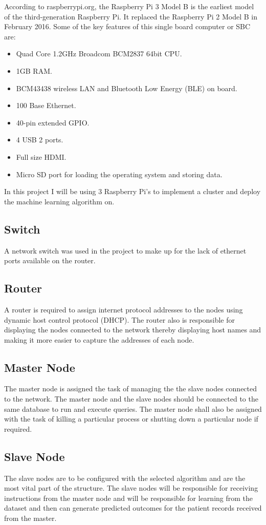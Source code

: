 \documentclass[12pt]{article}
\begin{document}
According to raspberrypi.org, the Raspberry Pi 3 Model B is the earliest model of the third-generation Raspberry Pi. It replaced the Raspberry Pi 2 Model B in February 2016. Some of the key features of this single board computer or SBC are:
\begin{itemize}
\item Quad Core 1.2GHz Broadcom BCM2837 64bit CPU.
\item 1GB RAM.
\item BCM43438 wireless LAN and Bluetooth Low Energy (BLE) on board.
\item 100 Base Ethernet.
\item 40-pin extended GPIO.
\item 4 USB 2 ports.
\item Full size HDMI.
\item Micro SD port for loading the operating system and storing data.
\end{itemize}
In this project I will be using 3 Raspberry Pi's to implement a cluster and deploy the machine learning algorithm on.

\subsection{Switch}
A network switch was used in the project to make up for the lack of ethernet ports available on the router.

\subsection{Router}
A router is required to assign internet protocol addresses to the nodes using dynamic host control protocol (DHCP). The router also is responsible for displaying the nodes connected to the network thereby displaying host names and making it more easier to capture the addresses of each node.

\subsection{Master Node}
The master node is assigned the task of managing the the slave nodes connected to the network. The master node and the slave nodes should be connected to the same database to run and execute queries. The master node shall also be assigned with the task of killing a particular process or shutting down a particular node if required.

\subsection{Slave Node}
The slave nodes are to be configured with the selected algorithm and are the most vital part of the structure. The slave nodes will be responsible for receiving instructions from the master node and will be responsible for learning from the dataset and then can generate predicted outcomes for the patient records received from the master. 
\end{document}
